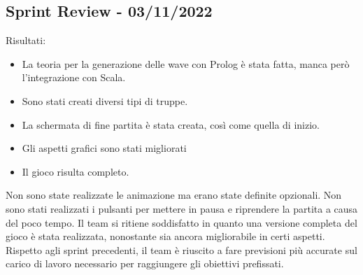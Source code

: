 \subsection*{Sprint Review - 03/11/2022}
Risultati:
\begin{itemize}
    \item La teoria per la generazione delle wave con Prolog è stata fatta, manca però l'integrazione con Scala.
    \item Sono stati creati diversi tipi di truppe.
    \item La schermata di fine partita è stata creata, così come quella di inizio.
    \item Gli aspetti grafici sono stati migliorati
    \item Il gioco risulta completo.
\end{itemize}
Non sono state realizzate le animazione ma erano state definite opzionali.
Non sono stati realizzati i pulsanti per mettere in pausa e riprendere la partita a causa del poco tempo.
Il team si ritiene soddisfatto in quanto una versione completa del gioco è stata realizzata, nonostante sia ancora migliorabile in certi aspetti.
Rispetto agli sprint precedenti, il team è riuscito a fare previsioni più accurate sul carico di lavoro necessario per raggiungere gli obiettivi prefissati.
